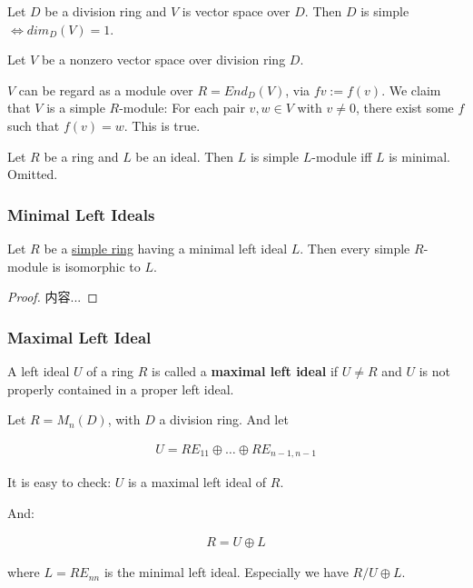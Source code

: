 \documentclass[Total.tex]{subfiles}
\begin{document}
	\begin{example}
		Let $D$ be a division ring and $V$ is vector space over $D$. Then $D$ is simple$\Leftrightarrow dim_D(V)=1$.
	\end{example}
	
	\begin{example}
		Let $V$ be a nonzero vector space over division ring $D$. 
		
		$V$ can be regard as a module over $R=End_D(V)$, via $fv:=f(v)$. 	We claim that $V$ is a simple $R$-module: For each pair $v,w\in V$ with $v\not=0$, there exist some $f$ such that $f(v)=w$. This is true. 
	\end{example}
	
	\begin{example}
		Let $R$ be a ring and $L$ be an ideal. Then $L$ is simple $L$-module iff $L$ is minimal. Omitted.
	\end{example}
	
	\subsubsection{Minimal Left Ideals}
	
	\begin{lemma}
		Let $R$ be a \underline{simple ring} having a minimal left ideal $L$. Then every simple $R$-module is isomorphic to $L$.
	\end{lemma}
	
	\begin{proof}
		内容...
	\end{proof}
	
	\subsubsection{Maximal Left Ideal}
	
	\begin{Def}
		A left ideal $U$ of a ring $R$ is called a \textbf{maximal left ideal} if $U\not=R$ and $U$ is not properly contained in a proper left ideal.
	\end{Def}
	
	\begin{example}
		Let $R=M_n(D)$, with $D$ a division ring. And let
		
		\begin{gather*}
			U=RE_{11}\oplus\dots\oplus RE_{n-1,n-1}
		\end{gather*}
		
		It is easy to check: $U$ is a maximal left ideal of $R$. 
		
		And:
		
		\begin{gather*}
			R=U\oplus L
		\end{gather*}
		
		where $L=RE_{nn}$ is the minimal left ideal. Especially we have $R/U\oplus L$. 
	\end{example}
	
\end{document}
